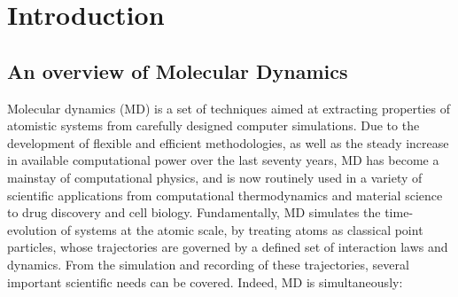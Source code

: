 \chapter{Introduction}
\label{chap:introduction}

\section{An overview of Molecular Dynamics}
Molecular dynamics (MD) is a set of techniques aimed at extracting properties of atomistic systems from carefully designed computer simulations.
Due to the development of flexible and efficient methodologies, as well as the steady increase in available computational power over the last seventy years, MD has become a mainstay of computational physics, and is now routinely used in a variety of scientific applications from computational thermodynamics and material science to drug discovery and cell biology.
Fundamentally, MD simulates the time-evolution of systems at the atomic scale, by treating atoms as classical point particles, whose trajectories are governed by a defined set of interaction laws and dynamics. From the simulation and recording of these trajectories, several important scientific needs can be covered. Indeed, MD is simultaneously:
